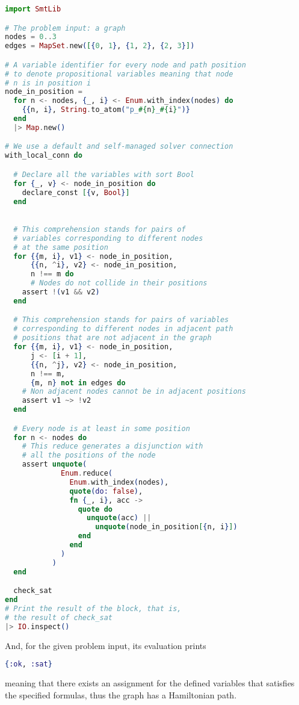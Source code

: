 \begin{lstlisting}[language=elixir,numbers=none,frame=none]
import SmtLib

# The problem input: a graph
nodes = 0..3
edges = MapSet.new([{0, 1}, {1, 2}, {2, 3}])

# A variable identifier for every node and path position
# to denote propositional variables meaning that node 
# n is in position i
node_in_position =
  for n <- nodes, {_, i} <- Enum.with_index(nodes) do
    {{n, i}, String.to_atom("p_#{n}_#{i}")}
  end
  |> Map.new()

# We use a default and self-managed solver connection
with_local_conn do

  # Declare all the variables with sort Bool
  for {_, v} <- node_in_position do
    declare_const [{v, Bool}]
  end

  
  # This comprehension stands for pairs of 
  # variables corresponding to different nodes 
  # at the same position
  for {{m, i}, v1} <- node_in_position, 
      {{n, ^i}, v2} <- node_in_position, 
      n !== m do
      # Nodes do not collide in their positions
    assert !(v1 && v2)
  end

  # This comprehension stands for pairs of variables 
  # corresponding to different nodes in adjacent path 
  # positions that are not adjacent in the graph
  for {{m, i}, v1} <- node_in_position,
      j <- [i + 1],
      {{n, ^j}, v2} <- node_in_position,
      n !== m,
      {m, n} not in edges do
    # Non adjacent nodes cannot be in adjacent positions 
    assert v1 ~> !v2
  end

  # Every node is at least in some position
  for n <- nodes do
    # This reduce generates a disjunction with 
    # all the positions of the node
    assert unquote(
             Enum.reduce(
               Enum.with_index(nodes),
               quote(do: false),
               fn {_, i}, acc ->
                 quote do
                   unquote(acc) ||
                     unquote(node_in_position[{n, i}])
                 end
               end
             )
           )
  end

  check_sat
end
# Print the result of the block, that is,
# the result of check_sat
|> IO.inspect()
\end{lstlisting}

And, for the given problem input, its evaluation prints 

\begin{lstlisting}[language=elixir,numbers=none,frame=none]
{:ok, :sat}
\end{lstlisting}

meaning that there exists an assignment for the defined variables that satisfies
the specified formulas, thus the graph has a Hamiltonian path.

